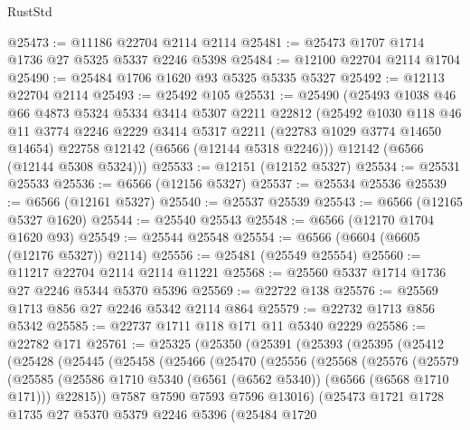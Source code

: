 \begin{lexlean}{RustStd}
\begin{coremodule}
@25473 := @11186 @22704 @2114 @2114
@25481 := @25473 @1707 @1714 @1736 @27 @5325 @5337 @2246 @5398
@25484 := @12100 @22704 @2114 @1704
@25490 := @25484 @1706 @1620 @93 @5325 @5335 @5327
@25492 := @12113 @22704 @2114
@25493 := @25492 @105
@25531 := @25490
    (@25493
      @1038
      @46
      @66
      @4873
      @5324
      @5334
      @3414
      @5307
      @2211
      @22812
      (@25492
        @1030
        @118
        @46
        @11
        @3774
        @2246
        @2229
        @3414
        @5317
        @2211
        (@22783 @1029 @3774 @14650 @14654)
        @22758
        @12142
        (@6566 (@12144 @5318 @2246)))
      @12142
      (@6566 (@12144 @5308 @5324)))
@25533 := @12151 (@12152 @5327)
@25534 := @25531 @25533
@25536 := @6566 (@12156 @5327)
@25537 := @25534 @25536
@25539 := @6566 (@12161 @5327)
@25540 := @25537 @25539
@25543 := @6566 (@12165 @5327 @1620)
@25544 := @25540 @25543
@25548 := @6566 (@12170 @1704 @1620 @93)
@25549 := @25544 @25548
@25554 := @6566 (@6604 (@6605 (@12176 @5327)) @2114)
@25556 := @25481 (@25549 @25554)
@25560 := @11217 @22704 @2114 @2114 @11221
@25568 := @25560 @5337 @1714 @1736 @27 @2246 @5344 @5370 @5396
@25569 := @22722 @138
@25576 := @25569 @1713 @856 @27 @2246 @5342 @2114 @864
@25579 := @22732 @1713 @856 @5342
@25585 := @22737 @1711 @118 @171 @11 @5340 @2229
@25586 := @22782 @171
@25761 := @25325
    (@25350
      (@25391
        (@25393
          (@25395
            (@25412
              (@25428
                (@25445
                  (@25458
                    (@25466
                      (@25470
                        (@25556
                          (@25568
                            (@25576
                              (@25579
                                (@25585
                                  (@25586
                                    @1710
                                    @5340
                                    (@6561 (@6562 @5340))
                                    (@6566 (@6568 @1710 @171)))
                                  @22815))
                              @7587
                              @7590
                              @7593
                              @7596
                              @13016)
                            (@25473
                              @1721
                              @1728
                              @1735
                              @27
                              @5370
                              @5379
                              @2246
                              @5396
                              (@25484
                                @1720

\end{coremodule}
\end{lexlean}
